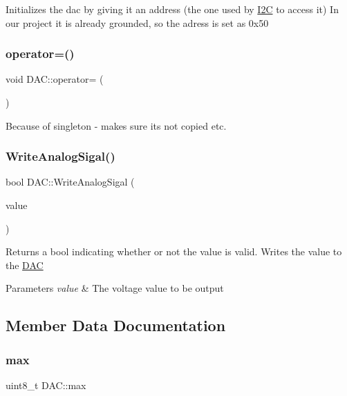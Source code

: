 Initializes the dac by giving it an address (the one used by \hyperlink{class_i2_c}{I2C} to access it) In our project it is already grounded, so the adress is set as 0x50 \hypertarget{class_d_a_c_a9e16a3d53b57588cba0ff2f9ade78e6b}{}\label{class_d_a_c_a9e16a3d53b57588cba0ff2f9ade78e6b} 
\subsubsection{\texorpdfstring{operator=()}{operator=()}}
{\footnotesize\ttfamily void D\+A\+C\+::operator= (\begin{DoxyParamCaption}\item[{const \hyperlink{class_d_a_c}{D\+AC} \&}]{ }\end{DoxyParamCaption})\hspace{0.3cm}{\ttfamily [delete]}}

Because of singleton -\/ makes sure its not copied etc. \hypertarget{class_d_a_c_ae7d843a3795822e893fb2b2d996b0666}{}\label{class_d_a_c_ae7d843a3795822e893fb2b2d996b0666} 
\subsubsection{\texorpdfstring{Write\+Analog\+Sigal()}{WriteAnalogSigal()}}
{\footnotesize\ttfamily bool D\+A\+C\+::\+Write\+Analog\+Sigal (\begin{DoxyParamCaption}\item[{uint8\+\_\+t}]{value }\end{DoxyParamCaption})}

Returns a bool indicating whether or not the value is valid. Writes the value to the \hyperlink{class_d_a_c}{D\+AC} 
\begin{DoxyParams}{Parameters}
{\em value} & The voltage value to be output \\
\hline
\end{DoxyParams}


\subsection{Member Data Documentation}
\hypertarget{class_d_a_c_a229a81d8ebf43511dfb6815c5cd8f425}{}\label{class_d_a_c_a229a81d8ebf43511dfb6815c5cd8f425} 
\subsubsection{\texorpdfstring{max}{max}}
{\footnotesize\ttfamily uint8\+\_\+t D\+A\+C\+::max\hspace{0.3cm}{\ttfamily [private]}}

